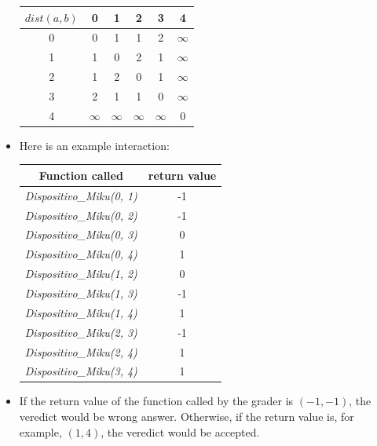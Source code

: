 \documentclass[12pt]{scrartcl}
\begin{document}
\begin{itemize}
            \begin{center}
                \begin{tabular}{|c||c|c|c|c|c|}
                    \hline
                    $dist(a, b)$ & 0 & 1 & 2 & 3 & 4 \\
                    \hline
                    \hline
                     0 & 0 & 1 & 1 & 2 & $\infty$ \\
                     \hline
                     1 & 1 & 0 & 2 & 1 & $\infty$ \\
                     \hline
                     2 & 1 & 2 & 0 & 1 & $\infty$ \\
                     \hline
                     3 & 2 & 1 & 1 & 0 & $\infty$ \\
                     \hline
                     4 & $\infty$ & $\infty$ & $\infty$ & $\infty$ & 0 \\
                     \hline 
                \end{tabular}
            \end{center}
            \item Here is an example interaction:
            \begin{center}
                \begin{tabular}{|c|c|}
                    \hline
                     Function called &  return value \\
                     \hline 
                     \hline 
                     \textit{Dispositivo\_Miku(0, 1)} & -1 \\
                     \hline 
                     \textit{Dispositivo\_Miku(0, 2)} & -1 \\
                     \hline 
                     \textit{Dispositivo\_Miku(0, 3)} & 0 \\
                     \hline 
                     \textit{Dispositivo\_Miku(0, 4)} & 1 \\
                     \hline 
                     \textit{Dispositivo\_Miku(1, 2)} & 0 \\
                     \hline 
                     \textit{Dispositivo\_Miku(1, 3)} & -1 \\
                     \hline 
                     \textit{Dispositivo\_Miku(1, 4)} & 1 \\
                     \hline 
                     \textit{Dispositivo\_Miku(2, 3)} & -1 \\
                     \hline 
                     \textit{Dispositivo\_Miku(2, 4)} & 1 \\
                     \hline 
                     \textit{Dispositivo\_Miku(3, 4)} & 1 \\
                     \hline 
                \end{tabular}
            \end{center}
            \item If the return value of the function called by the grader is $(-1, -1)$, the veredict would be wrong answer. Otherwise, if the return value is, for example, $(1, 4)$, the veredict would be accepted.
        \end{itemize}
        
\end{document}
